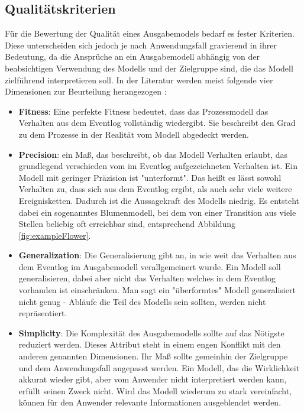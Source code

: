 \subsection{Qualitätskriterien}\label{quality}
Für die Bewertung der Qualität eines Ausgabemodels  bedarf es fester Kriterien. Diese unterscheiden sich jedoch je nach Anwendungsfall gravierend in ihrer Bedeutung, da die Ansprüche an ein Ausgabemodell abhängig von der beabsichtigen Verwendung des Modells und der Zielgruppe sind, die das Modell zielführend interpretieren soll. In der Literatur werden meist folgende vier Dimensionen zur Beurteilung herangezogen \cite{PMinAction}:

\begin{itemize}
\item \textbf{Fitness}: Eine perfekte Fitness bedeutet, dass das Prozessmodell das Verhalten aus dem Eventlog vollständig wiedergibt. Sie beschreibt den Grad zu dem Prozesse in der Realität vom Modell abgedeckt werden.
 
\item \textbf{Precision}: ein Maß, das beschreibt, ob das Modell Verhalten erlaubt, das grundlegend verschieden vom im Eventlog aufgezeichneten Verhalten ist. Ein Modell mit geringer Präzision ist "unterformt". Das heißt es lässt sowohl Verhalten zu, dass sich aus dem Eventlog ergibt, als auch sehr viele weitere Ereignisketten. Dadurch ist die Aussagekraft des Modells niedrig. Es entsteht dabei ein sogenanntes Blumenmodell, bei dem von einer Transition aus viele Stellen beliebig oft erreichbar sind, entsprechend Abbildung \ref{fig:exampleFlower}.

\item \textbf{Generalization}: Die Generalisierung gibt an, in wie weit das Verhalten aus dem Eventlog im Ausgabemodell verallgemeinert wurde. Ein Modell soll generalisieren, dabei aber nicht das Verhalten welches in dem Eventlog vorhanden ist einschränken. Man sagt ein "überformtes" Modell generalisiert nicht genug - Abläufe die Teil des Modells sein sollten, werden nicht repräsentiert.

\item \textbf{Simplicity}: Die Komplexität des Ausgabemodells sollte auf das Nötigste reduziert werden. Dieses Attribut steht in einem engen Konflikt mit den anderen genannten Dimensionen. Ihr Maß sollte gemeinhin der Zielgruppe und dem Anwendungsfall angepasst werden. Ein Modell, das die Wirklichkeit akkurat wieder gibt, aber vom Anwender nicht interpretiert werden kann, erfüllt seinen Zweck nicht. Wird das Modell wiederum zu stark vereinfacht, können für den Anwender relevante Informationen ausgeblendet werden.
\end{itemize}

